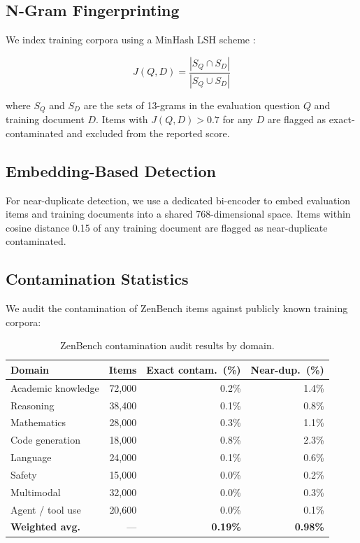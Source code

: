 \documentclass[11pt,a4paper]{article}
\begin{document}
\subsection{N-Gram Fingerprinting}

We index training corpora using a MinHash LSH scheme \cite{broder1997resemblance}:

\begin{equation}
    J(Q, D) = \frac{|S_Q \cap S_D|}{|S_Q \cup S_D|}
    \label{eq:jaccard}
\end{equation}

where $S_Q$ and $S_D$ are the sets of 13-grams in the evaluation question $Q$ and
training document $D$. Items with $J(Q, D) > 0.7$ for any $D$ are flagged as
exact-contaminated and excluded from the reported score.

\subsection{Embedding-Based Detection}

For near-duplicate detection, we use a dedicated bi-encoder to embed evaluation items
and training documents into a shared 768-dimensional space. Items within cosine distance
0.15 of any training document are flagged as near-duplicate contaminated.

\subsection{Contamination Statistics}

We audit the contamination of ZenBench items against publicly known training corpora:

\begin{table}[H]
\centering
\caption{ZenBench contamination audit results by domain.}
\begin{tabular}{lrrr}
\toprule
\textbf{Domain} & \textbf{Items} & \textbf{Exact contam.\ (\%)} & \textbf{Near-dup.\ (\%)} \\
\midrule
Academic knowledge & 72,000 & 0.2\% & 1.4\% \\
Reasoning         & 38,400 & 0.1\% & 0.8\% \\
Mathematics       & 28,000 & 0.3\% & 1.1\% \\
Code generation   & 18,000 & 0.8\% & 2.3\% \\
Language          & 24,000 & 0.1\% & 0.6\% \\
Safety            & 15,000 & 0.0\% & 0.2\% \\
Multimodal        & 32,000 & 0.0\% & 0.3\% \\
Agent / tool use  & 20,600 & 0.0\% & 0.1\% \\
\midrule
\textbf{Weighted avg.} & --- & \textbf{0.19\%} & \textbf{0.98\%} \\
\bottomrule
\end{tabular}
\label{tab:contamination}
\end{table}
\end{document}
